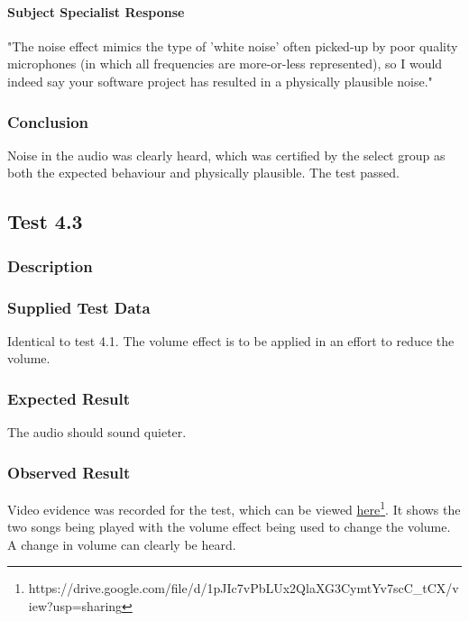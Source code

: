 \paragraph{Subject Specialist Response}
"The noise effect mimics the type of 'white noise' often picked-up by poor quality microphones (in which all frequencies are more-or-less represented), so I would indeed say your software project has resulted in a physically plausible noise."

\subsubsection*{Conclusion}
Noise in the audio was clearly heard, which was certified by the select group as both the expected behaviour and physically plausible. The test passed.


\pagebreak
\subsection{Test 4.3}
\subsubsection*{Description}
\paragraph{}
{
	\centering
}

\subsubsection*{Supplied Test Data}
Identical to test 4.1. The volume effect is to be applied in an effort to reduce the volume.

\subsubsection*{Expected Result}
The audio should sound quieter.

\subsubsection*{Observed Result}
\label{sec:evidence4.3}
Video evidence was recorded for the test, which can be viewed \href{https://drive.google.com/file/d/1pJIc7vPbLUx2QlaXG3CymtYv7scC_tCX/view?usp=sharing}{here}\footnote{
	https://drive.google.com/file/d/1pJIc7vPbLUx2QlaXG3CymtYv7scC\_tCX/view?usp=sharing
}. It shows the two songs being played with the volume effect being used to change the volume. A change in volume can clearly be heard.

